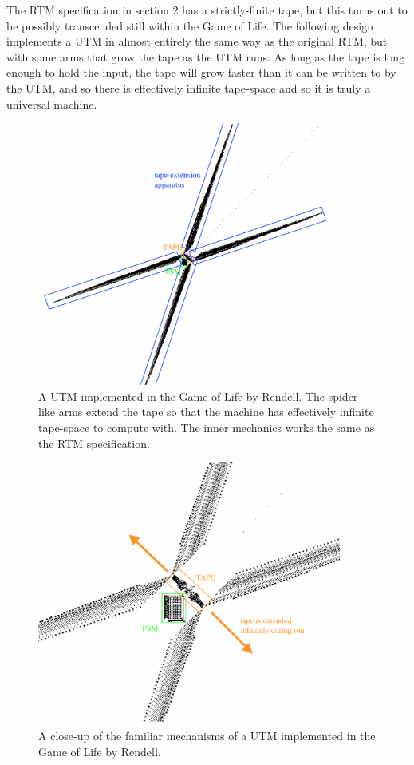 \documentclass{article}
\begin{document}
The RTM specification in section 2 has a strictly-finite tape, but this turns out to be possibly transcended still within the Game of Life. The following design implements a UTM in almost entirely the same way as the original RTM, but with some arms that grow the tape as the UTM runs. As long as the tape is long enough to hold the input, the tape will grow faster than it can be written to by the UTM, and so there is effectively infinite tape-space and so it is truly a universal machine.



\begin{figure}[h]
\centering
\includegraphics[width=10cm,keepaspectratio]{images/URTM-infinite.png}
\captionsetup{labelformat=empty} \caption{A UTM implemented in the Game of Life by Rendell. The spider-like arms extend the tape so that the machine has effectively infinite tape-space to compute with. The inner mechanics works the same as the RTM specification.}
\end{figure}

\begin{figure}[h]
\centering
\includegraphics[width=10cm,keepaspectratio]{images/URTM-zoom.png}
\captionsetup{labelformat=empty} \caption{A close-up of the familiar mechanisms of a UTM implemented in the Game of Life by Rendell.}
\end{figure}
\end{document}
